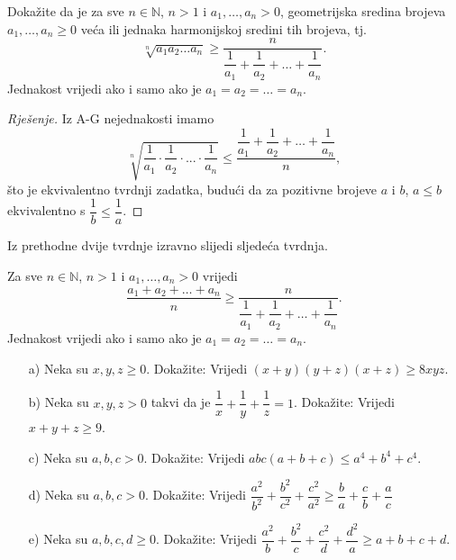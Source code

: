 \begin{exercise}[H-G nejednakost]
Dokažite da je za sve $n\in \mathbb{N}$, $n>1$ i $a_1, \dots, a_n> 0$, geometrijska sredina brojeva $a_1, \dots, a_n\geq 0$ veća ili jednaka harmonijskoj sredini tih brojeva, tj.
$$\sqrt[n]{a_1a_2\dots a_n}\geq \dfrac{n}{\dfrac{1}{a_1}+\dfrac{1}{a_2}+\dots+\dfrac{1}{a_n}}.$$
Jednakost vrijedi ako i samo ako je $a_1=a_2=\dots=a_n$.
\end{exercise}
\begin{proof}[Rješenje]
Iz A-G nejednakosti imamo
$$\sqrt[n]{\dfrac{1}{a_1}\cdot \dfrac{1}{a_2}\cdot ...\cdot \dfrac{1}{a_n}}\leq \dfrac{\dfrac{1}{a_1}+\dfrac{1}{a_2}+\dots+\dfrac{1}{a_n}}{n},$$
što je ekvivalentno tvrdnji zadatka, budući da za pozitivne brojeve $a$ i $b$, $a\leq b$ ekvivalentno s $\dfrac{1}{b}\leq \dfrac{1}{a}$.
\end{proof}
\noindent Iz prethodne dvije tvrdnje izravno slijedi sljedeća tvrdnja.
\begin{corollary}[A-H nejednakost]
Za sve $n\in \mathbb{N}$, $n>1$ i $a_1, \dots, a_n> 0$ vrijedi
$$\dfrac{a_1+a_2+\dots+a_n}{n}\geq \dfrac{n}{\dfrac{1}{a_1}+\dfrac{1}{a_2}+\dots+\dfrac{1}{a_n}}.$$
Jednakost vrijedi ako i samo ako je $a_1=a_2=\dots=a_n$.
\end{corollary}
\begin{exercise}\textbf{}
\begin{itemize}
\item[a)] Neka su $x, y, z\geq 0$. Dokažite: Vrijedi $(x+y)(y+z)(x+z)\geq 8xyz$.
\item[b)] Neka su $x, y, z> 0$ takvi da je $\dfrac{1}{x}+\dfrac{1}{y}+\dfrac{1}{z}=1$. Dokažite: Vrijedi $x+y+z\geq 9$.
\item[c)] Neka su $a, b, c> 0$. Dokažite: Vrijedi
$abc(a+b+c)\leq a^4+b^4+c^4$.
\item[d)] Neka su $a, b, c> 0$. Dokažite: Vrijedi
$\dfrac{a^2}{b^2}+\dfrac{b^2}{c^2}+\dfrac{c^2}{a^2}\geq \dfrac{b}{a}+\dfrac{c}{b}+\dfrac{a}{c}$
\item[e)] Neka su $a, b, c, d\geq 0$. Dokažite: Vrijedi
$\dfrac{a^2}{b}+\dfrac{b^2}{c}+\dfrac{c^2}{d}+\dfrac{d^2}{a}\geq a+b+c+d$.
\end{itemize}
\end{exercise}
